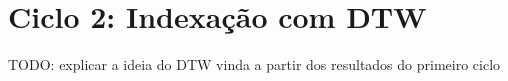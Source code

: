 \chapter{Ciclo 2: Indexação com DTW}
\label{chap:dtw}

TODO: explicar a ideia do DTW vinda a partir dos resultados do primeiro ciclo